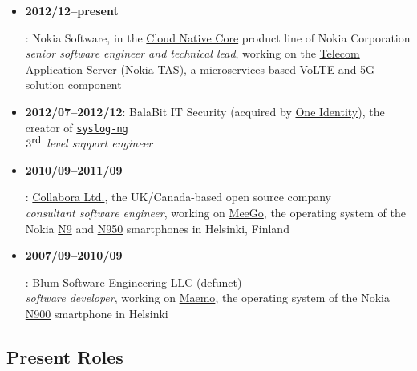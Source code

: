 \documentclass[a4paper,12pt]{article}
\newcommand{\compress}{\setlength\itemsep{-\parskip}}
\newenvironment{compressedItemize}{\begin{itemize}\compress}{\end{itemize}}
\begin{document}
\begin{compressedItemize}
\item	\hypertarget{TAS}{\textbf{2012/12--present}}: Nokia Software, in the
	\href{https://www.nokia.com/networks/portfolio/cloud-native-core/}%
	{Cloud Native Core} product line of Nokia Corporation \\
	\textit{senior software engineer and technical lead}, working on the
	\href{https://www.nokia.com/networks/products/telecom-application-server/}%
	{Telecom Application Server} (Nokia TAS), a microservices-based VoLTE
	and 5G solution component
\item	\textbf{2012/07--2012/12}:
	BalaBit IT Security (acquired by
	\href{https://www.oneidentity.com}{One Identity}),
	the creator of \href{https://www.syslog-ng.com/products/open-source-log-management/}{\texttt{syslog-ng}} \\
	\textit{$3^{\textrm{\small rd}}$ level support engineer}
\item	\hypertarget{MeeGo}{\textbf{2010/09--2011/09}}:
	\href{https://www.collabora.com/about-us}{Collabora Ltd.},
	the UK/Canada-based open source company \\
	\textit{consultant software engineer}, working on
	\href{https://en.wikipedia.org/wiki/MeeGo}{MeeGo}, the operating system
	of the Nokia \href{https://en.wikipedia.org/wiki/Nokia_N9}{N9} and
	\href{https://en.wikipedia.org/wiki/Nokia_N950}{N950} smartphones
	in Helsinki, Finland
\item	\hypertarget{Maemo}{\textbf{2007/09--2010/09}}:
	Blum Software Engineering LLC (defunct) \\
	\textit{software developer}, working on \href{http://maemo.org}{Maemo},
	the operating system of the Nokia
	\href{http://maemo.org/intro/maemo_history}{N900} smartphone
	in Helsinki
\end{compressedItemize}

\subsection*{Present Roles}
\end{document}
